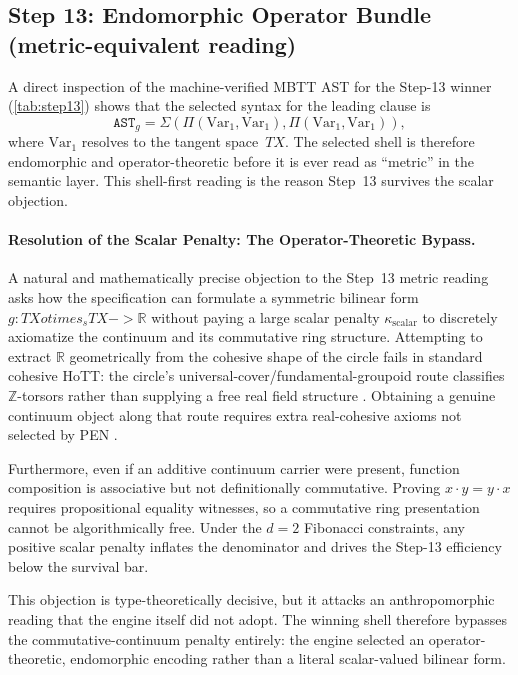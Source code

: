 \documentclass[11pt,a4paper]{article}
\def\to{->}%
\def\otimes{otimes}%
\theoremstyle{plain}
\theoremstyle{definition}
\theoremstyle{remark}
\newcommand{\R}{\mathbb{R}}
\begin{document}
\subsection{\texorpdfstring{Step 13: Endomorphic Operator Bundle (metric-equivalent reading)}{Step 13: Endomorphic Operator Bundle (metric-equivalent reading)}}
\label{app:metric-spec}

A direct inspection of the machine-verified MBTT AST for the Step-13 winner (\cref{tab:step13}) shows that the selected syntax for the leading clause is
\[
  \mathtt{AST}_g = \Sigma(\Pi(\mathrm{Var}_1, \mathrm{Var}_1), \Pi(\mathrm{Var}_1, \mathrm{Var}_1)),
\]
where $\mathrm{Var}_1$ resolves to the tangent space~$TX$.
The selected shell is therefore endomorphic and operator-theoretic before it is ever read as ``metric'' in the semantic layer.
This shell-first reading is the reason Step~13 survives the scalar objection.

\paragraph{Resolution of the Scalar Penalty: The Operator-Theoretic Bypass.}
A natural and mathematically precise objection to the Step~13 metric reading asks how the specification can formulate a symmetric bilinear form $g : TX \otimes_s TX \to \R$ without paying a large scalar penalty $\kappa_{\mathrm{scalar}}$ to discretely axiomatize the continuum and its commutative ring structure.
Attempting to extract $\R$ geometrically from the cohesive shape of the circle fails in standard cohesive HoTT: the circle's universal-cover/fundamental-groupoid route classifies $\mathbb{Z}$-torsors rather than supplying a free real field structure \cite{licata-shulman}.
Obtaining a genuine continuum object along that route requires extra real-cohesive axioms not selected by PEN \cite{shulman-real-cohesive}.

Furthermore, even if an additive continuum carrier were present, function composition is associative but not definitionally commutative.
Proving $x \cdot y = y \cdot x$ requires propositional equality witnesses, so a commutative ring presentation cannot be algorithmically free.
Under the $d=2$ Fibonacci constraints, any positive scalar penalty inflates the denominator and drives the Step-13 efficiency below the survival bar.

This objection is type-theoretically decisive, but it attacks an anthropomorphic reading that the engine itself did not adopt.
The winning shell therefore bypasses the commutative-continuum penalty entirely: the engine selected an operator-theoretic, endomorphic encoding rather than a literal scalar-valued bilinear form.
\end{document}
